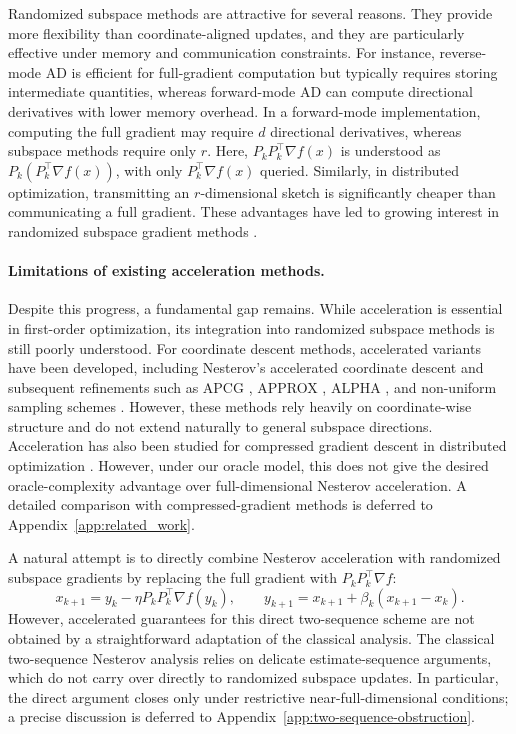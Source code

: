\documentclass[10pt]{article}
\begin{document}
Randomized subspace methods are attractive for several reasons.
They provide more flexibility than coordinate-aligned updates, and they are particularly effective under memory and communication constraints.
For instance, reverse-mode AD is efficient for full-gradient computation but
typically requires storing intermediate quantities,
whereas forward-mode AD can compute directional derivatives with lower memory
overhead. 
In a forward-mode implementation, computing the full gradient may
require \(d\) directional derivatives,
whereas subspace methods require only \(r\).
Here, \(P_kP_k^\top\nabla f(x)\) is understood as
\(P_k(P_k^\top\nabla f(x))\), with only \(P_k^\top\nabla f(x)\) queried.
Similarly, in distributed optimization, transmitting an \(r\)-dimensional sketch is significantly cheaper than communicating a full gradient.
These advantages have led to growing interest in randomized subspace gradient methods
\cite{kozak2021,nesterovspokoiny2017,baydin2022gradients,nozawa2023rsg_constrained,omiya2026rsnsgd,flynn2024}.  

\paragraph{Limitations of existing acceleration methods.}
Despite this progress, a fundamental gap remains. While acceleration is essential in first-order optimization, its integration into randomized subspace methods is still poorly understood. For coordinate descent methods, accelerated variants have been developed, including Nesterov's accelerated coordinate descent \cite{nesterov2012} and subsequent refinements such as APCG \cite{lin2014apcg}, APPROX \cite{fercoq2015approx}, ALPHA
\cite{qu2016coordinate}, and non-uniform sampling schemes \cite{allenzhu2016}. However, these methods rely heavily on coordinate-wise structure and do not extend naturally to general subspace directions. 
Acceleration has also been studied for compressed gradient descent in distributed optimization \cite{li2020acgd}.
However, under our oracle model, this does not give the desired oracle-complexity advantage over full-dimensional Nesterov acceleration.
A detailed comparison with compressed-gradient methods is deferred to Appendix~\ref{app:related_work}.



  A natural attempt is to directly combine Nesterov acceleration with randomized subspace gradients by replacing the full gradient with \(P_k P_k^\top \nabla f\):
\[
x_{k+1}=y_k-\eta P_kP_k^\top \nabla f(y_k),
\qquad
y_{k+1}=x_{k+1}+\beta_k(x_{k+1}-x_k).
\]
 However, accelerated guarantees for this direct two-sequence scheme are not obtained by a straightforward adaptation of the classical analysis.
The classical two-sequence Nesterov analysis relies on delicate estimate-sequence arguments,
which do not carry over directly to randomized subspace updates.
In particular, the direct argument closes only under restrictive near-full-dimensional conditions;
a precise discussion is deferred to Appendix~\ref{app:two-sequence-obstruction}.
\end{document}
